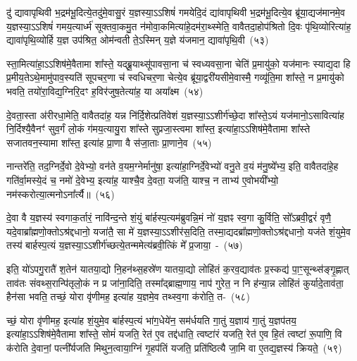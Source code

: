 दु॑ द्यावापृथिवी भ॒द्रम॑भू॒दित्ये॒तदु॑मे॒वासु॒रं य॒ज्ञस्या॒\-ऽऽ\-शिषं॑ गमयेदि॒दं द्या॑वापृथिवी भ॒द्रम॑भू॒दित्ये॒व ब्रू॑या॒द्यज॑मानमे॒व य॒ज्ञस्या॒\-ऽऽ\-शिषं॑ गमय॒त्यार्ध्म॑ सूक्तवा॒कमु॒त न॑मोवा॒कमित्या॑\-हे॒दम॑रा॒थ्स्मेति॒ वावैतदा॒होप॑श्रितो दि॒वः पृ॑थि॒व्योरित्या॑ह॒ द्यावा॑पृथि॒व्योर्\mbox{}हि य॒ज्ञ उप॑श्रित॒ ओम॑न्वती ते॒\-ऽस्मिन् य॒ज्ञे य॑जमान॒ द्यावा॑\-पृथि॒वी~(५३)\ip

स्ता॒मित्या॑हा॒\-ऽऽ\-शिष॑मे॒वैतामा शा᳚स्ते॒ यद्ब्रू॒याथ्सू॑पावसा॒ना च॑ स्वध्यवसा॒ना चेति॑ प्र॒मायु॑को॒ यज॑मानः स्याद्य॒दा हि प्र॒मीय॒ते\-ऽथे॒मामु॑पाव॒स्यति॑ सूपचर॒णा च॑ स्वधिचर॒णा चेत्ये॒व ब्रू॑या॒द्वरी॑यसीमे॒वास्मै॒ गव्यू॑ति॒मा शा᳚स्ते॒ न प्र॒मायु॑को भवति॒ तयो॑रा॒विद्य॒ग्निरि॒दꣳ ह॒विर॑जुष॒तेत्या॑ह॒ या अया᳚क्ष्म~(५४)\ip

दे॒वता॒स्ता अ॑रीरधा॒मेति॒ वावैतदा॑ह॒ यन्न नि॑र्दि॒शेत्प्रति॑वेशं य॒ज्ञस्या॒\-ऽऽ\-शीर्ग॑च्छे॒दा शा᳚स्ते॒\-ऽयं यज॑मानो॒\-ऽसावित्या॑ह नि॒र्दिश्यै॒वैनꣳ॑ सुव॒र्गं लो॒कं ग॑मय॒त्यायु॒रा शा᳚स्ते सुप्रजा॒स्त्वमा शा᳚स्त॒ इत्या॑हा॒\-ऽऽ\-शिष॑मे॒वैतामा शा᳚स्ते सजातवन॒स्यामा शा᳚स्त॒ इत्या॑ह प्रा॒णा वै स॑जा॒ताः प्रा॒णाने॒व~(५५)\ip

नान्तरे॑ति॒ तद॒ग्निर्दे॒वो दे॒वेभ्यो॒ वन॑ते व॒यम॒ग्नेर्मानु॑षा॒ इत्या॑हा॒ग्निर्दे॒वेभ्यो॑ वनु॒ते व॒यं म॑नु॒ष्ये᳚भ्य॒ इति॒ वावैतदा॑हे॒ह गति॑र्वा॒मस्ये॒दं च॒ नमो॑ दे॒वेभ्य॒ इत्या॑ह॒ याश्चै॒व दे॒वता॒ यज॑ति॒ याश्च॒ न ताभ्य॑ ए॒वोभयी᳚भ्यो॒ नम॑स्करोत्या॒त्मनो\-ऽना᳚र्त्यै॥~(५६)\ip

{\anuvakamend[{श्रि॒तस्ते॒ प्र त्रि॒ष्टुभ॑मे॒तद्द्यावा॑\-पृथि॒वी या अया᳚क्ष्म प्रा॒णाने॒व षट्च॑त्वारिꣳशच्च}]}

दे॒वा वै य॒ज्ञस्य॑ स्वगाक॒र्तारं॒ नावि॑न्द॒न्ते शं॒युं बा॑र्\mbox{}हस्प॒त्य\-म॑ब्रुवन्नि॒मं नो॑ य॒ज्ञꣴ स्व॒गा कु॒र्विति॒ सो᳚\-ऽब्रवी॒द्वरं॑ वृणै॒ यदे॒वा\-ब्रा᳚ह्मणो॒क्तो\-ऽश्र॑द्दधानो॒ यजा॑तै॒ सा मे॑ य॒ज्ञस्या॒\-ऽऽ\-शीर॑स॒दिति॒ तस्मा॒द्यदब्रा᳚ह्मणो॒क्तो\-ऽश्र॑द्दधानो॒ यज॑ते शं॒युमे॒व तस्य॑ बार्\mbox{}हस्प॒त्यं य॒ज्ञस्या॒\-ऽऽ\-शीर्ग॑च्छ\-त्ये॒तन्ममेत्य॑ब्रवी॒त्किं मे᳚ प्र॒जाया॒~-~(५७)\ip

इति॒ यो॑\-ऽपगु॒रातै॑ श॒तेन॑ यातया॒द्यो नि॒हन॑थ्स॒हस्रे॑ण यातया॒द्यो लोहि॑तं क॒रव॒द्याव॑तः प्र॒स्कद्य॑ पा॒ꣳ॒सून्थ्स॑ङ्गृ॒ह्णात् ताव॑तः संवथ्स॒रान्पि॑तृलो॒कं न प्र जा॑ना॒दिति॒ तस्मा᳚द्\-ब्राह्म॒णाय॒ नाप॑ गुरेत॒ न नि ह॑न्या॒न्न लोहि॑तं कुर्यादे॒ताव॑ता॒ हैन॑सा भवति॒ तच्छं॒ योरा वृ॑णीमह॒ इत्या॑ह य॒ज्ञमे॒व तथ्स्व॒गा क॑रोति॒ त-~(५८)\ip

च्छं॒ योरा वृ॑णीमह॒ इत्या॑ह शं॒युमे॒व बा॑र्\mbox{}हस्प॒त्यं भा॑ग॒धेये॑न॒ सम॑र्धयति गा॒तुं य॒ज्ञाय॑ गा॒तुं य॒ज्ञप॑तय॒ इत्या॑हा॒\-ऽऽ\-शिष॑मे॒वैतामा शा᳚स्ते॒ सोमं॑ यजति॒ रेत॑ ए॒व तद्द॑धाति॒ त्वष्टा॑रं यजति॒ रेत॑ ए॒व हि॒तं त्वष्टा॑ रू॒पाणि॒ वि क॑रोति दे॒वानां॒ पत्नी᳚र्यजति मिथुन॒त्वाया॒ग्निं गृ॒हप॑तिं यजति॒ प्रति॑ष्ठित्यै जा॒मि वा ए॒तद्य॒ज्ञस्य॑ क्रियते॒~(५९)\ip

